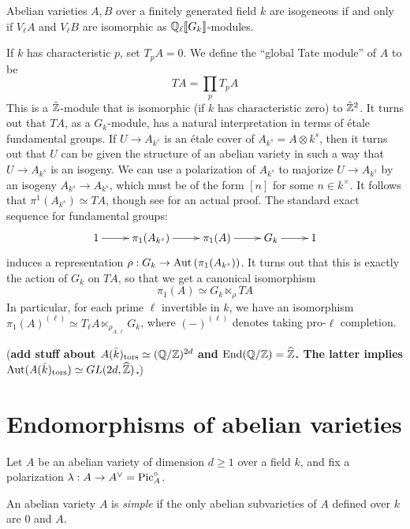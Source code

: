 \documentclass{article}
\begin{document}
\begin{corollary}
Abelian varieties $A,B$ over a finitely generated field $k$ are isogeneous if 
and only if $V_\ell A$ and $V_\ell B$ are isomorphic as 
$\mathbb{Q}_\ell\llbracket G_k\rrbracket$-modules.
\end{corollary}

If $k$ has characteristic $p$, set $T_p A=0$. We define the ``global Tate 
module'' of $A$ to be 
\[
  T A = \prod_p T_p A
\]
This is a $\hat{\mathbb{Z}}$-module that is isomorphic (if $k$ has characteristic 
zero) to $\hat{\mathbb{Z}}^2$. It turns out that $T A$, as a $G_k$-module, has a 
natural interpretation in terms of \'etale fundamental groups. If 
$U\to A_{k^s}$ is an \'etale cover of $A_{k^s}=A\otimes k^s$, then it turns out 
that $U$ can be given the structure of an abelian variety in such a way that 
$U\to A_{k^s}$ is an isogeny. We can use a polarization of $A_{k^s}$ to 
majorize $U\to A_{k^s}$ by an isogeny $A_{k^s}\to A_{k^s}$, which must be of 
the form $[n]$ for some $n\in k^\times$. It follows that 
$\pi^1(A_{k^s}) \simeq T A$, though see \cite[10.37]{gm13} for an actual 
proof. The standard exact sequence for fundamental groups:
\[\xymatrix{
  1 \ar[r] 
    & \pi_1(A_{k^s}) \ar[r] 
    & \pi_1(A) \ar[r] 
    & G_k \ar[r] 
    & 1
}\]
induces a representation 
$\rho:G_k\to \operatorname{Aut}\left(\pi_1(A_{k^s})\right)$. It turns out that 
this is exactly the action of $G_k$ on $T A$, so that we get a canonical 
isomorphism 
\[
  \pi_1(A) \simeq G_k \ltimes_\rho T A
\]
In particular, for each prime $\ell$ invertible in $k$, we have an isomorphism 
$\pi_1(A)^{(\ell)} \simeq T_\ell A\ltimes_{\rho_{A,\ell}} G_k$, where 
$(-)^{(\ell)}$ denotes taking pro-$\ell$ completion. 

(\textbf{add stuff about $A(\bar k)_\mathrm{tors}\simeq (\mathbb{Q}/\mathbb{Z})^{2d}$ and 
$\operatorname{End}(\mathbb{Q}/\mathbb{Z})=\widehat{\mathbb{Z}}$. The latter implies 
$\operatorname{Aut}(A(\bar k)_\mathrm{tors})\simeq GL(2 d,\widehat{\mathbb{Z}})$.})





\section{Endomorphisms of abelian varieties}

Let $A$ be an abelian variety of dimension $d\geqslant 1$ over a field $k$, 
and fix a polarization $\lambda:A\to A^\vee=\operatorname{Pic}_A^\circ$. 

\begin{definition}
An abelian variety $A$ is \emph{simple} if the only abelian subvarieties of $A$ 
defined over $k$ are $0$ and $A$.
\end{definition}
\end{document}
